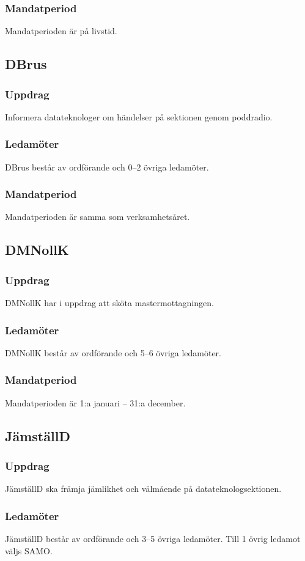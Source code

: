 \subsubsection{Mandatperiod}
Mandatperioden är på livstid.

\subsection{DBrus}
\subsubsection{Uppdrag}
Informera datateknologer om händelser på sektionen genom poddradio.
\subsubsection{Ledamöter}
DBrus består av ordförande och 0--2 övriga ledamöter.
\subsubsection{Mandatperiod}
Mandatperioden är samma som verksamhetsåret.

\subsection{DMNollK}
\subsubsection{Uppdrag}
DMNollK har i uppdrag att sköta mastermottagningen.
\subsubsection{Ledamöter}
DMNollK består av ordförande och 5--6 övriga ledamöter.
\subsubsection{Mandatperiod}
Mandatperioden är 1:a januari -- 31:a december.

\subsection{JämställD}
\subsubsection{Uppdrag}
JämställD ska främja jämlikhet och välmående på datateknologsektionen.
\subsubsection{Ledamöter}
JämställD består av ordförande och 3--5 övriga ledamöter. Till 1 övrig ledamot väljs SAMO.
